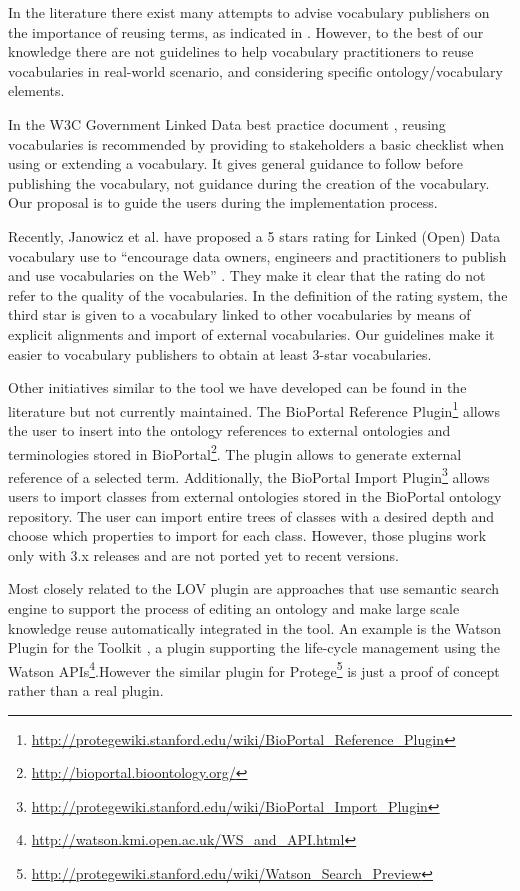 In the literature there exist many attempts to advise vocabulary publishers on the importance of reusing terms, as indicated in \cite{janowicz2014five,jimenez2008}. However, to the best of our knowledge there are not guidelines to help vocabulary practitioners to reuse vocabularies in real-world scenario, and considering specific ontology/vocabulary elements. 

In the W3C Government Linked Data best practice document \cite{hyland14}, reusing vocabularies is recommended by providing to stakeholders a basic checklist when using or extending a vocabulary. It gives general guidance to follow before publishing the vocabulary, not guidance during the creation of the vocabulary. Our proposal is to guide the users during the implementation process.

Recently, Janowicz et al. have proposed a 5 stars rating for Linked (Open) Data vocabulary use to ``encourage data owners, engineers and practitioners to publish and use vocabularies on the Web'' \cite{janowicz2014five}. They make it clear that the rating do not refer to the quality of the vocabularies. In the definition of the rating system, the third star is given to a vocabulary linked to other vocabularies by means of explicit alignments and import of external vocabularies. Our guidelines make it easier to vocabulary publishers to obtain at least 3-star vocabularies.

Other initiatives similar to the tool we have developed can be found in the literature but not currently maintained. The BioPortal Reference Plugin\footnote{\url{http://protegewiki.stanford.edu/wiki/BioPortal_Reference_Plugin}} allows the user to insert into the ontology references to external ontologies and terminologies stored in BioPortal\footnote{\url{http://bioportal.bioontology.org/}}. The plugin allows to generate external reference of a selected term. Additionally, the BioPortal Import Plugin\footnote{\url{http://protegewiki.stanford.edu/wiki/BioPortal_Import_Plugin}} allows users to import classes from external ontologies stored in the BioPortal ontology repository. The user can import entire trees of classes with a desired depth and choose which properties to import for each class. However, those plugins work only with \protege 3.x releases and are not ported yet to recent versions. 

Most closely related to the {\protege}LOV plugin are approaches that use semantic search engine to support the process of editing an ontology and make large scale knowledge reuse automatically integrated in the tool. An example is the Watson Plugin \cite{neonguide2008} for the \neon Toolkit \cite{haase2008neon}, a plugin supporting the \neon life-cycle management using the Watson \cite{d2007watson} APIs\footnote{\url{http://watson.kmi.open.ac.uk/WS_and_API.html}}.However the similar plugin for Protege\footnote{\url{http://protegewiki.stanford.edu/wiki/Watson_Search_Preview}} is just a proof of concept rather than a real plugin.

 
